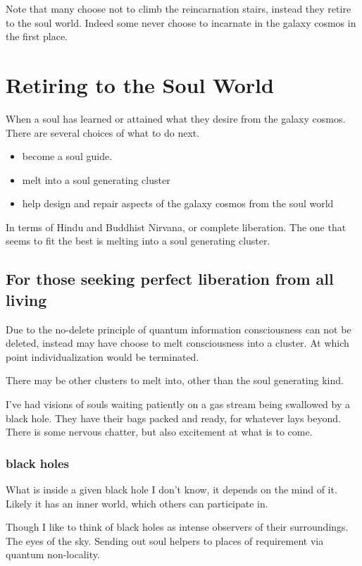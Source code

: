 Note that many choose not to climb the reincarnation stairs, instead they retire
to the soul world. Indeed some never choose to incarnate in the galaxy cosmos in
the first place. 

\chapter{Retiring to the Soul World}
When a soul has learned or attained what they desire from the galaxy cosmos. 
There are several choices of what to do next. 

\begin{itemize}
  \item become a soul guide\cite{newton1994journey}.
  \item melt into a soul generating cluster\cite{ascendedmasters}\cite{newton2000destiny}
  \item help design and repair aspects of the galaxy cosmos from the soul
world\cite{newton2000destiny}
\end{itemize}

In terms of Hindu and Buddhist Nirvana, or complete liberation.
The one that seems to fit the best is melting into a soul generating cluster. 

\section{For those seeking perfect liberation from all living}

Due to the no-delete principle of quantum
information\cite{quantumInformation}  consciousness can not
be deleted, instead may have choose to melt consciousness into a
cluster. At which point individualization would be terminated. 

There may be other clusters to melt into, other than the soul generating kind.

I've had visions of souls waiting patiently on a gas stream being swallowed by a
black hole. They have their bags packed and ready, for whatever lays beyond.
There is some nervous chatter, but also excitement at what is to come. 

\subsection{black holes}
What is inside a given black hole I don't know, it depends on the mind of it. 
Likely it has an inner world, which others can participate in.

Though I like to think of black holes as intense observers of their
surroundings.  The eyes of the sky. 
Sending out soul helpers to places of requirement via quantum non-locality.

